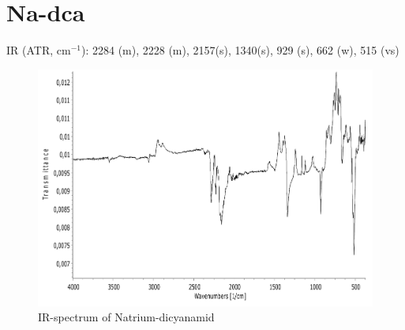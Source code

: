 \documentclass[11pt]{scrartcl}
\begin{document}
\section{Na-dca} 
IR (ATR, cm$^{-1}$): 2284 (m), 2228 (m), 2157(s), 1340(s), 929 (s), 662 (w), 515 (vs)

\begin{figure}[h!]
\includegraphics[width=1\textwidth]{Na-dca-IR.pdf}
\caption{IR-spectrum of Natrium-dicyanamid}
\label{fig:dca-ir}
\end{figure}
\end{document}
